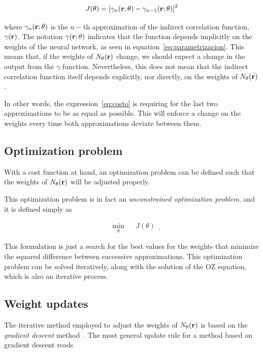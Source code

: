 \begin{equation}
    J(\theta) = \left[\gamma_{n}(\mathbf{r}; \theta) - \gamma_{n-1}(\mathbf{r}; \theta) \right]^2
    \label{eq:costo}
\end{equation}

where $\gamma_{n}(\mathbf{r}; \theta)$ is the $n-$th approximation of the indirect
correlation function, $\gamma(\mathbf{r})$.
The notation $\gamma(\mathbf{r}; \theta)$ indicates that the function depends implicitly
on the weights of the neural network, as seen in equation~\eqref{eq:parametrizacion}.
This means that, if the weights of $N_{\theta}(\mathbf{r})$ change, we should expect a change in the output
from the $\gamma$ function. Nevertheless, this does not mean that the indirect
correlation function itself depends explicitly, nor directly, on the weights of
$N_{\theta}(\mathbf{r})$.

In other words, the expression~\eqref{eq:costo} is requiring for the last two approximations
to be as equal as possible. This will enforce a change on the weights every time both
approximations deviate between them.

\subsection{Optimization problem}
With a cost function at hand, an optimization problem can be defined such that the
weights of $N_{\theta}(\mathbf{r})$ will be adjusted properly.

This optimization problem is in fact an \emph{unconstrained optimization problem},
and it is defined simply as

\begin{equation}
    \begin{aligned}
         & \underset{\theta}{\text{min}}
         & & J(\theta)
    \end{aligned}
    .
    \label{eq:optimizacion}
\end{equation}

This formulation is just a search for the best values for the weights that minimize
the squared difference between successive approximations.
This optimization problem can be solved iteratively, along with the solution of the
OZ equation, which is also an iterative process.

\subsection{Weight updates}
The iterative method employed to adjust the weights of $N_{\theta}(\mathbf{r})$ is based on the
\emph{gradient descent} method~\cite{nocedalNumericalOptimization2006}.
The most general update rule for a method based on gradient descent reads

